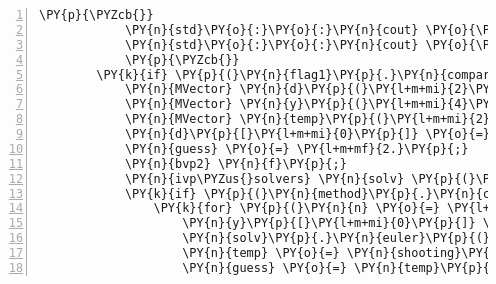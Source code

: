 \begin{Verbatim}[tabsize=2,commandchars=\\\{\},numbers=left,firstnumber=1,stepnumber=1]
			\PY{p}{\PYZcb{}}
			\PY{n}{std}\PY{o}{:}\PY{o}{:}\PY{n}{cout} \PY{o}{\PYZlt{}}\PY{o}{\PYZlt{}} \PY{l+s}{\PYZdq{}}\PY{l+s}{y(x): }\PY{l+s}{\PYZdq{}} \PY{o}{\PYZlt{}}\PY{o}{\PYZlt{}} \PY{n}{y}\PY{p}{[}\PY{l+m+mi}{0}\PY{p}{]} \PY{o}{\PYZlt{}}\PY{o}{\PYZlt{}} \PY{n}{std}\PY{o}{:}\PY{o}{:}\PY{n}{endl}\PY{p}{;} \PY{c+c1}{// output the important values}
			\PY{n}{std}\PY{o}{:}\PY{o}{:}\PY{n}{cout} \PY{o}{\PYZlt{}}\PY{o}{\PYZlt{}} \PY{l+s}{\PYZdq{}}\PY{l+s}{y\PYZsq{}(x): }\PY{l+s}{\PYZdq{}} \PY{o}{\PYZlt{}}\PY{o}{\PYZlt{}} \PY{n}{y}\PY{p}{[}\PY{l+m+mi}{1}\PY{p}{]} \PY{o}{\PYZlt{}}\PY{o}{\PYZlt{}} \PY{n}{std}\PY{o}{:}\PY{o}{:}\PY{n}{endl}\PY{p}{;}
			\PY{p}{\PYZcb{}}
		\PY{k}{if} \PY{p}{(}\PY{n}{flag1}\PY{p}{.}\PY{n}{compare}\PY{p}{(}\PY{l+s}{\PYZdq{}}\PY{l+s}{\PYZhy{}b2}\PY{l+s}{\PYZdq{}}\PY{p}{)} \PY{o}{=}\PY{o}{=} \PY{l+m+mi}{0}\PY{p}{)}\PY{p}{\PYZob{}}
			\PY{n}{MVector} \PY{n}{d}\PY{p}{(}\PY{l+m+mi}{2}\PY{p}{)}\PY{p}{;} \PY{c+c1}{// set the boundary conditions}
			\PY{n}{MVector} \PY{n}{y}\PY{p}{(}\PY{l+m+mi}{4}\PY{p}{)}\PY{p}{;} \PY{c+c1}{// to contain the problem}
			\PY{n}{MVector} \PY{n}{temp}\PY{p}{(}\PY{l+m+mi}{2}\PY{p}{)}\PY{p}{;} \PY{c+c1}{// keep the output from shooting}
			\PY{n}{d}\PY{p}{[}\PY{l+m+mi}{0}\PY{p}{]} \PY{o}{=} \PY{l+m+mf}{17.}\PY{p}{;} \PY{n}{d}\PY{p}{[}\PY{l+m+mi}{1}\PY{p}{]} \PY{o}{=} \PY{p}{(}\PY{l+m+mf}{43.}\PY{o}{/}\PY{l+m+mf}{3.}\PY{p}{)}\PY{p}{;}
			\PY{n}{guess} \PY{o}{=} \PY{l+m+mf}{2.}\PY{p}{;}
			\PY{n}{bvp2} \PY{n}{f}\PY{p}{;}
			\PY{n}{ivp\PYZus{}solvers} \PY{n}{solv} \PY{p}{(}\PY{n}{steps}\PY{p}{,} \PY{l+m+mf}{1.}\PY{p}{,} \PY{l+m+mf}{3.}\PY{p}{)}\PY{p}{;}
			\PY{k}{if} \PY{p}{(}\PY{n}{method}\PY{p}{.}\PY{n}{compare}\PY{p}{(}\PY{l+s}{\PYZdq{}}\PY{l+s}{euler}\PY{l+s}{\PYZdq{}}\PY{p}{)} \PY{o}{=}\PY{o}{=} \PY{l+m+mi}{0}\PY{p}{)}\PY{p}{\PYZob{}}
				\PY{k}{for} \PY{p}{(}\PY{n}{n} \PY{o}{=} \PY{l+m+mi}{0}\PY{p}{;} \PY{n}{n} \PY{o}{\PYZlt{}} \PY{l+m+mi}{500}\PY{p}{;} \PY{n}{n}\PY{o}{+}\PY{o}{+}\PY{p}{)}\PY{p}{\PYZob{}}
					\PY{n}{y}\PY{p}{[}\PY{l+m+mi}{0}\PY{p}{]} \PY{o}{=} \PY{l+m+mf}{17.}\PY{p}{;} \PY{n}{y}\PY{p}{[}\PY{l+m+mi}{1}\PY{p}{]} \PY{o}{=} \PY{n}{guess}\PY{p}{;} \PY{n}{y}\PY{p}{[}\PY{l+m+mi}{2}\PY{p}{]} \PY{o}{=} \PY{l+m+mf}{0.}\PY{p}{;} \PY{n}{y}\PY{p}{[}\PY{l+m+mi}{3}\PY{p}{]} \PY{o}{=} \PY{l+m+mf}{1.}\PY{p}{;}
					\PY{n}{solv}\PY{p}{.}\PY{n}{euler}\PY{p}{(}\PY{n}{y}\PY{p}{,} \PY{n}{f}\PY{p}{,} \PY{n}{j}\PY{p}{)}\PY{p}{;}
					\PY{n}{temp} \PY{o}{=} \PY{n}{shooting}\PY{p}{(}\PY{n}{guess}\PY{p}{,} \PY{n}{y}\PY{p}{,} \PY{n}{d}\PY{p}{)}\PY{p}{;}
					\PY{n}{guess} \PY{o}{=} \PY{n}{temp}\PY{p}{[}\PY{l+m+mi}{0}\PY{p}{]}\PY{p}{;}

\end{Verbatim}
